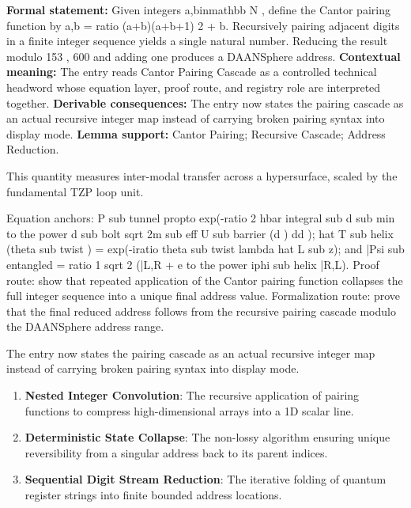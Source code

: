 \begingroup\footnotesize\setlength{\emergencystretch}{3em}\sloppy
\textbf{Formal statement:} Given integers a,binmathbb N , define the Cantor pairing function by a,b = ratio (a+b)(a+b+1) 2 + b. Recursively pairing adjacent digits in a finite integer sequence yields a single natural number. Reducing the result modulo 153 , 600 and adding one produces a DAANSphere address. \textbf{Contextual meaning:} The entry reads Cantor Pairing Cascade as a controlled technical headword whose equation layer, proof route, and registry role are interpreted together. \textbf{Derivable consequences:} The entry now states the pairing cascade as an actual recursive integer map instead of carrying broken pairing syntax into display mode. \textbf{Lemma support:} Cantor Pairing; Recursive Cascade; Address Reduction.\par
\endgroup

This quantity measures inter-modal transfer across a hypersurface, scaled by the fundamental TZP loop unit.

Equation anchors: P sub tunnel propto exp(-ratio 2 hbar integral sub d sub min to the power d sub bolt sqrt 2m sub eff U sub barrier (d ) dd ); hat T sub helix (theta sub twist ) = exp(-iratio theta sub twist lambda hat L sub z); and |Psi sub entangled = ratio 1 sqrt 2 (|L,R + e to the power iphi sub helix |R,L). Proof route: show that repeated application of the Cantor pairing function collapses the full integer sequence into a unique final address value. Formalization route: prove that the final reduced address follows from the recursive pairing cascade modulo the DAANSphere address range.

The entry now states the pairing cascade as an actual recursive integer map instead of carrying broken pairing syntax into display mode.
\endgroup

\begin{enumerate}[leftmargin=1.6em,itemsep=6pt,topsep=4pt]
\item \textbf{Nested Integer Convolution}: The recursive application of pairing functions to compress high-dimensional arrays into a 1D scalar line.
\item \textbf{Deterministic State Collapse}: The non-lossy algorithm ensuring unique reversibility from a singular address back to its parent indices.
\item \textbf{Sequential Digit Stream Reduction}: The iterative folding of quantum register strings into finite bounded address locations.
\end{enumerate}

